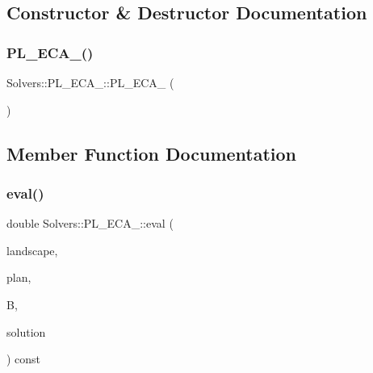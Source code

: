 \subsection{Constructor \& Destructor Documentation}
\mbox{\label{class_solvers_1_1_p_l___e_c_a__3_a9af5b2a3a8f0df9de16a23781d56066a}} 
\subsubsection{\texorpdfstring{P\+L\+\_\+\+E\+C\+A\+\_()}{PL\_ECA\_3()}}
{\footnotesize\ttfamily Solvers\+::\+P\+L\+\_\+\+E\+C\+A\+\_\+::\+P\+L\+\_\+\+E\+C\+A\+\_ (\begin{DoxyParamCaption}{ }\end{DoxyParamCaption})\hspace{0.3cm}{\ttfamily [inline]}}



\subsection{Member Function Documentation}
\mbox{\label{class_solvers_1_1_p_l___e_c_a__3_ae18471edc442194d0e8b786c3eb35f90}} 
\subsubsection{\texorpdfstring{eval()}{eval()}}
{\footnotesize\ttfamily double Solvers\+::\+P\+L\+\_\+\+E\+C\+A\+\_\+::eval (\begin{DoxyParamCaption}\item[{const \hyperlink{class_landscape}{Landscape} \&}]{landscape,  }\item[{const \hyperlink{class_restoration_plan}{Restoration\+Plan} \&}]{plan,  }\item[{const double}]{B,  }\item[{const \hyperlink{class_solution}{Solution} \&}]{solution }\end{DoxyParamCaption}) const}

